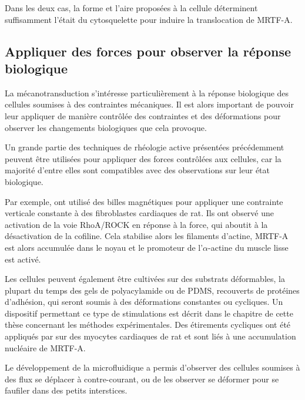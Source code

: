 Dans les deux cas, la forme et l'aire proposées à la cellule déterminent suffisamment l'était du cytosquelette pour induire la translocation de MRTF-A.  

\subsection{Appliquer des forces pour observer la réponse biologique}

La mécanotransduction s'intéresse particulièrement à la réponse biologique des cellules soumises à des contraintes mécaniques. 
Il est alors important de pouvoir leur appliquer de manière contrôlée des contraintes et des déformations pour observer les changements biologiques que cela provoque. 

Un grande partie des techniques de rhéologie active présentées précédemment peuvent être utilisées pour appliquer des forces contrôlées aux cellules, car la majorité d'entre elles sont compatibles avec des observations sur leur état biologique.

Par exemple,\cite{zhao_force_2007} ont utilisé des billes magnétiques pour appliquer une contrainte verticale constante à des fibroblastes cardiaques de rat. Ils ont observé une activation de la voie RhoA/ROCK en réponse à la force, qui aboutit à la désactivation de la cofiline. Cela stabilise alors les filaments d'actine, MRTF-A est alors accumulée dans le noyau et le promoteur de l'$\alpha$-actine  du muscle lisse est activé. 

Les cellules peuvent également être cultivées sur des substrats déformables, la plupart du temps des gels de polyacylamide ou de PDMS, recouverts de protéines d'adhésion, qui seront soumis à des déformations constantes ou cycliques. Un dispositif permettant ce type de stimulations est décrit dans le chapitre de cette thèse concernant les méthodes expérimentales. 
Des étirements cycliques ont été appliqués par \cite{kuwahara_myocardin-related_2010} sur des myocytes cardiaques de rat et sont liés à une accumulation nucléaire de MRTF-A.  


Le développement de la microfluidique a permis d'observer des cellules soumises à des flux se déplacer à contre-courant, ou de les observer se déformer pour se faufiler dans des petits interstices. 

%
